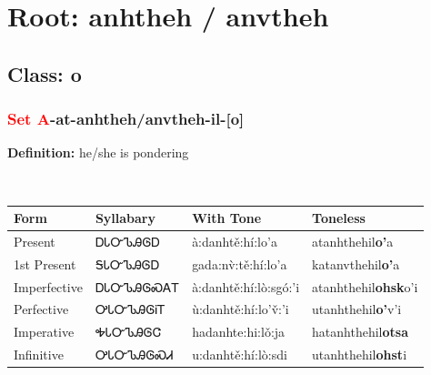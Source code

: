 \needspace{4in}
\section*{Root: anhtheh / anvtheh}
\nopagebreak
{}
\needspace{3in}
\subsection*{Class: o}
\nopagebreak
\needspace{2in}
\subsubsection*{\textcolor{Red}{Set A}{-}at{-}\textbf{anhtheh/anvtheh}{-}il{-}[o]}
\nopagebreak
\textbf{Definition: } he/she is pondering
\\[0.5em]
\begin{tabularx}{\textwidth}{l X X X}%
\toprule%
\textbf{Form}&\textbf{Syllabary}&\textbf{With Tone}&\textbf{Toneless}\\%
\midrule%
Present&ᎠᏓᏅᏖᎯᎶᎠ&à:danhtě:hí:lo’a&atanhthehil\textbf{o'}a\\%
1st Present&ᎦᏓᏅᏖᎯᎶᎠ&gada:nv̀:tě:hí:lo’a&katanvthehil\textbf{o'}a\\%
Imperfective&ᎠᏓᏅᏖᎯᎶᏍᎪᎢ&à:danhtě:hí:lò:sgó:’i&atanhthehil\textbf{ohsk}o'i\\%
Perfective&ᎤᏓᏅᏖᎯᎶᎥᎢ&ù:danhtě:hí:lo’v̌:’i&utanhthehil\textbf{o'}v'i\\%
Imperative&ᎭᏓᏅᏖᎯᎶᏣ&hadanhte:hi:lǒ:ja&hatanhthehil\textbf{otsa}\\%
Infinitive&ᎤᏓᏅᏖᎯᎶᏍᏗ&u:danhtě:hí:lò:sdi&utanhthehil\textbf{ohst}i\\%
\bottomrule%
\end{tabularx}
\\[1em]